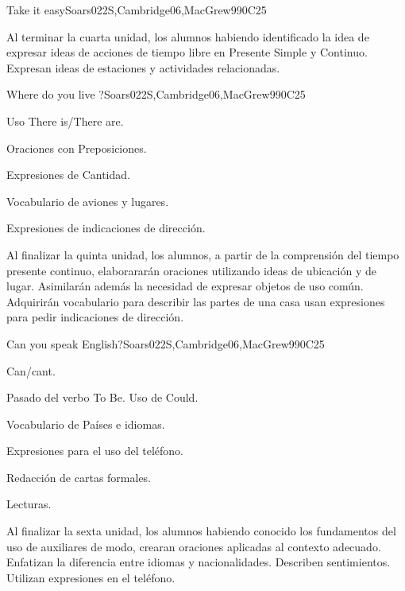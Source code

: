 \begin{syllabus}
\begin{unit}{Take it easy}{}{Soars022S,Cambridge06,MacGrew99}{0}{C25}
   \begin{learningoutcomes}
      \item Al terminar la cuarta unidad, los alumnos habiendo identificado la idea de expresar ideas de acciones de tiempo libre en Presente Simple y Continuo. Expresan ideas de estaciones y actividades relacionadas.
   \end{learningoutcomes}

\end{unit}

\begin{unit}{Where do you live ?}{}{Soars022S,Cambridge06,MacGrew99}{0}{C25}
   \begin{topics}
      \item Uso There is/There are.
      \item Oraciones con Preposiciones.
      \item Expresiones de Cantidad.
      \item Vocabulario de aviones y lugares.
      \item Expresiones de indicaciones de dirección.
   \end{topics}

   \begin{learningoutcomes}
      \item Al finalizar la quinta unidad, los alumnos, a partir de la comprensión del tiempo presente continuo, elaborararán oraciones utilizando ideas de ubicación y de lugar. Asimilarán además la necesidad de expresar objetos de uso común. Adquirirán vocabulario para describir las partes de una casa usan expresiones para pedir indicaciones de dirección.
   \end{learningoutcomes}
\end{unit}

\begin{unit}{Can you speak English?}{}{Soars022S,Cambridge06,MacGrew99}{0}{C25}
   \begin{topics}
      \item Can/cant.
      \item Pasado del verbo To Be. Uso de Could.
      \item Vocabulario de Paí­ses e idiomas.
      \item Expresiones para el uso del teléfono.
      \item Redacción de cartas formales.
      \item Lecturas.
   \end{topics}

   \begin{learningoutcomes}
      \item Al finalizar la sexta unidad, los alumnos habiendo conocido los fundamentos del uso de auxiliares de modo, crearan oraciones aplicadas al contexto adecuado. Enfatizan la diferencia entre idiomas y nacionalidades. Describen sentimientos. Utilizan expresiones en el teléfono.
   \end{learningoutcomes}
\end{unit}


\end{syllabus}
